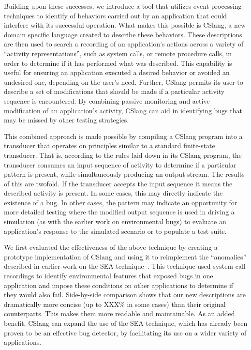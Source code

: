 Building upon these successes,
we introduce a tool
that utilizes event processing techniques
to identify
of behaviors carried out by an application
that could interfere with its successful operation.
What makes this possible is CSlang,
a new domain specific language
created to describe these behaviors.
These descriptions are then used
to search a recording of an application's actions
across a variety of ``activity representations'',
such as system calls,
or remote procedure calls,
in order to determine if it has
performed what was described.
This capability is useful
for ensuring an application executed a desired behavior
or avoided an undesired one,
depending on the user's need.
Further, CSlang permits
its user to describe a set of modifications
that should be made
if a particular activity sequence is encountered.
By combining passive monitoring and active modification
of an application's activity,
CSlang can aid in identifying bugs
that may be missed by other testing strategies.

This combined approach is made possible
by compiling a CSlang program
into a transducer
that operates on principles similar
to a standard finite-state transducer.
That is,
according to the rules laid down in its CSlang program,
the transducer consumes an input sequence of activity
to determine if a particular pattern is present,
while simultaneously producing an output stream.
The results of this are twofold.
If the transducer accepts the input sequence
it means the described activity is present.
In some cases,
this may directly indicate
the existence of a bug.
In other cases,
the pattern may
indicate an opportunity
for more detailed testing
where the modified output sequence is used
in driving a simulation (as with the earlier work on environmental bugs)
to evaluate an application's response to the simulated scenario
or to populate a test suite.

We first evaluated the effectiveness of the above technique
by creating a prototype implementation of CSlang
and using it to
reimplement the ``anomalies''
described in earlier work on the SEA technique~\cite{crashsim}.
This technique used system call recordings
to identify environmental features that
exposed bugs in one application
and impose these conditions on other applications
to determine if they would also fail.
Side-by-side comparison shows that our new
descriptions are dramatically more concise (up to XXX\% in some cases)
than their original counterparts.
This makes them
more readable
and maintainable.
As an added benefit,
CSlang can expand the use of the SEA technique,
which has already been proven
to be an effective bug detector,
by facilitating its use
on a wider variety of applications.

